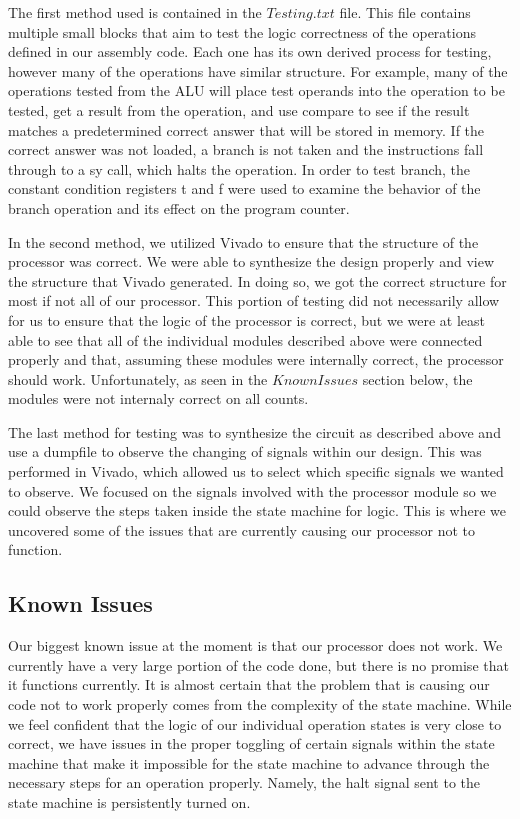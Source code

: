 \documentclass[journal]{IEEEtran}
\begin{document}
	The first method used is contained in the $Testing.txt$ file. This file contains multiple small blocks that aim to test the logic correctness of the operations defined in our assembly code. Each one has its own derived process for testing, however many of the operations have similar structure. For example, many of the operations tested from the ALU will place test operands into the operation to be tested, get a result from the operation, and use compare to see if the result matches a predetermined correct answer that will be stored in memory. If the correct answer was not loaded, a branch is not taken and the instructions fall through to a sy call, which halts the operation. In order to test branch, the constant condition registers t and f were used to examine the behavior of the branch operation and its effect on the program counter.
	
	In the second method, we utilized Vivado to ensure that the structure of the processor was correct. We were able to synthesize the design properly and view the structure that Vivado generated. In doing so, we got the correct structure for most if not all of our processor. This portion of testing did not necessarily allow for us to ensure that the logic of the processor is correct, but we were at least able to see that all of the individual modules described above were connected properly and that, assuming these modules were internally correct, the processor should work. Unfortunately, as seen in the $Known Issues$ section below, the modules were not internaly correct on all counts.
	
	The last method for testing was to synthesize the circuit as described above and use a dumpfile to observe the changing of signals within our design. This was performed in Vivado, which allowed us to select which specific signals we wanted to observe. We focused on the signals involved with the processor module so we could observe the steps taken inside the state machine for logic. This is where we uncovered some of the issues that are currently causing our processor not to function. 

\subsection{Known Issues}
	Our biggest known issue at the moment is that our processor does not work. We currently have a very large portion of the code done, but there is no promise that it functions currently. It is almost certain that the problem that is causing our code not to work properly comes from the complexity of the state machine. While we feel confident that the logic of our individual operation states is very close to correct, we have issues in the proper toggling of certain signals within the state machine that make it impossible for the state machine to advance through the necessary steps for an operation properly. Namely, the halt signal sent to the state machine is persistently turned on. 
\end{document}
